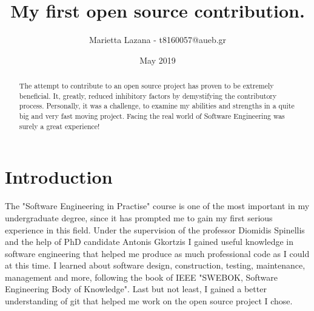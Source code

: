 \documentclass{article}
\title{My first open source contribution.}
\author{Marietta Lazana - t8160057@aueb.gr}
\date{May 2019}
\begin{document}
\maketitle

\begin{abstract}
The attempt to contribute to an open source project has proven to be extremely beneficial. It, greatly, reduced inhibitory factors by demystifying the contributory process. Personally, it was a challenge, to examine my abilities and strengths in a quite big and very fast moving project. Facing the real world of Software Engineering was surely a great experience!
  
\end{abstract}

\section{Introduction}
The "Software Engineering in Practise" course is one of the most important in my undergraduate degree, since it has prompted me to gain my first serious experience in this field. Under the supervision of the professor Diomidis Spinellis and the help of PhD candidate Antonis Gkortzis I gained useful knowledge in software engineering that helped me produce as much professional code as I could at this time. I learned about software design, construction, testing, maintenance, management and more, following the book of IEEE "SWEBOK, Software Engineering  Body of Knowledge". Last but not least, I gained a better understanding of git that helped me work on the open source project I chose.
\end{document}
